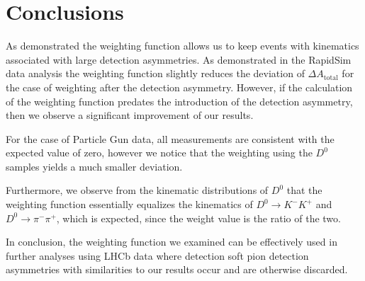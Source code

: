 \documentclass{article}
\begin{document}
        \section{Conclusions}
        As demonstrated the weighting function allows us to keep events with kinematics associated with large detection asymmetries.
        As demonstrated in the RapidSim data analysis the weighting function slightly reduces the deviation of $\Delta A_\text{total}$ for the case of weighting after the detection asymmetry.
        However, if the calculation of the weighting function predates the introduction of the detection asymmetry, then we observe a significant improvement of our results.

        For the case of Particle Gun data, all measurements are consistent with the expected value of zero, however we notice that the weighting using the $D^0$ samples yields a much smaller deviation.

        Furthermore, we observe from the kinematic distributions of $D^0$ that the weighting function essentially equalizes the kinematics of $D^0\to K^-K^+$ and $D^0\to \pi^-\pi^+$, which is expected, since the weight value is the ratio of the two.
        
        In conclusion, the weighting function we examined can be effectively used in further analyses using LHCb data where detection soft pion detection asymmetries with similarities to our results occur and are otherwise discarded.
        


        \pagebreak
        \nocite{*}
        \printbibliography[notcategory=cited]
\end{document}
